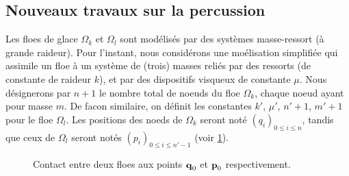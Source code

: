 \subsection{Nouveaux travaux sur la percussion}



Les floes de glace $\Omega_k$ et $\Omega_l$ sont modélisés par des systèmes masse-ressort (à grande raideur). Pour l'instant, nous considérons une moélisation simplifiée qui assimile un floe à un système de (trois) masses reliés par des ressorts (de constante de raideur $k$), et par des dispositifs visqueux de constante $\mu$.
Nous désignerons par $n+1$ le nombre total de noeuds du floe $\Omega_k$, chaque noeud ayant pour masse $m$. De facon similaire, on définit les constantes $k'$, $\mu'$, $n'+1$, $m'+1$ pour le floe $\Omega_l$. Les positions des noeds de $\Omega_k$ seront noté $(q_i)_{0\leq i\leq n}$, tandis que ceux de $\Omega_l$ seront notés $(p_i)_{0 \leq i\leq n'-1}$ (voir \cref{fig:contactmanuel}). 

\begin{figure}[!h]
    \centering
    \caption{Contact entre deux floes aux points $\bm{\mathrm{q}}_0$ et $\bm{\mathrm{p}}_0$ respectivement.}
    \label{fig:contactmanuel}
\end{figure}

